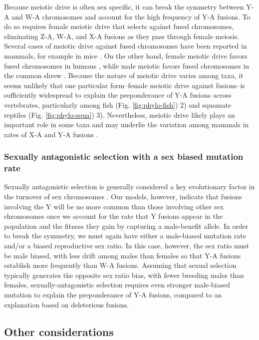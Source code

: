 Because meiotic drive is often sex specific, it can break the symmetry between Y-A and W-A chromosomes and account for the high frequency of Y-A fusions. To do so requires female meiotic drive that selects against fused chromosomes, eliminating Z-A, W-A, and X-A fusions as they pass through female meiosis. Several cases of meiotic drive against fused chromosomes have been reported in mammals, for example in mice \citep{Pardo2001a, Pardo2001b}. On the other hand, female meiotic drive favors fused chromosomes in humans \citep{Pardo2001a}, while male meiotic favors fused chromosomes in the common shrew \citep{Searle1986, Wyttenbach1998}. Because the nature of meiotic drive varies among taxa, it seems unlikely that one particular form--female meiotic drive against fusions--is sufficiently widespread to explain the preponderance of Y-A fusions across vertebrates, particularly among fish (Fig. \ref{fig:phylo-fish}) 2) and squamate reptiles (Fig. \ref{fig:phylo-squa}) 3). Nevertheless, meiotic drive likely plays an important role in some taxa and may underlie the variation among mammals in rates of X-A and Y-A fusions \citep{Yoshida2012}.

\subsubsection{Sexually antagonistic selection with a sex biased mutation rate}

Sexually antagonistic selection is generally considered a key evolutionary factor in the turnover of sex chromosomes \citep{Charlesworth1980, vandoorn2007}. Our models, however, indicate that fusions involving the Y will be no more common than those involving other sex chromosomes once we account for the rate that Y fusions appear in the population and the fitness they gain by capturing a male-benefit allele. In order to break the symmetry, we must again have either a male-biased mutation rate and/or a biased reproductive sex ratio. In this case, however, the sex ratio must be male biased, with less drift among males than females so that Y-A fusions establish more frequently than W-A fusions. Assuming that sexual selection typically generates the opposite sex ratio bias, with fewer breeding males than females, sexually-antagonistic selection requires even stronger male-biased mutation to explain the preponderance of Y-A fusions, compared to an explanation based on deleterious fusions. 

\subsection{Other considerations}

